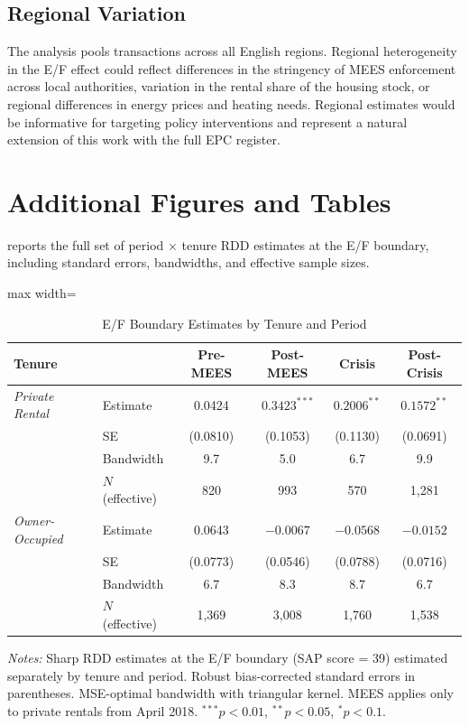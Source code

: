 \documentclass[12pt]{article}
\begin{document}
\subsection{Regional Variation}

The analysis pools transactions across all English regions. Regional heterogeneity in the E/F effect could reflect differences in the stringency of MEES enforcement across local authorities, variation in the rental share of the housing stock, or regional differences in energy prices and heating needs. Regional estimates would be informative for targeting policy interventions and represent a natural extension of this work with the full EPC register.


\section{Additional Figures and Tables}\label{app:additional}

 reports the full set of period $\times$ tenure RDD estimates at the E/F boundary, including standard errors, bandwidths, and effective sample sizes.

\begin{table}[H]
\centering
\caption{E/F Boundary Estimates by Tenure and Period}
\label{tab:tenure_ef}
\begin{adjustbox}{max width=\textwidth}
\begin{tabular}{llcccc}
\toprule
Tenure & & Pre-MEES & Post-MEES & Crisis & Post-Crisis \\
\midrule
\textit{Private Rental} & Estimate & 0.0424 & $0.3423^{***}$ & $0.2006^{**}$ & $0.1572^{**}$ \\
 & SE & (0.0810) & (0.1053) & (0.1130) & (0.0691) \\
 & Bandwidth & 9.7 & 5.0 & 6.7 & 9.9 \\
 & $N$ (effective) & 820 & 993 & 570 & 1,281 \\
\addlinespace
\textit{Owner-Occupied} & Estimate & 0.0643 & $-0.0067$ & $-0.0568$ & $-0.0152$ \\
 & SE & (0.0773) & (0.0546) & (0.0788) & (0.0716) \\
 & Bandwidth & 6.7 & 8.3 & 8.7 & 6.7 \\
 & $N$ (effective) & 1,369 & 3,008 & 1,760 & 1,538 \\
\bottomrule
\end{tabular}
\end{adjustbox}
\begin{minipage}{\textwidth}
\footnotesize
\textit{Notes:} Sharp RDD estimates at the E/F boundary (SAP score = 39) estimated separately by tenure and period.
Robust bias-corrected standard errors in parentheses.
MSE-optimal bandwidth with triangular kernel. MEES applies only to private rentals from April 2018.
$^{***}p<0.01$, $^{**}p<0.05$, $^{*}p<0.1$.
\end{minipage}
\end{table}
\end{document}
